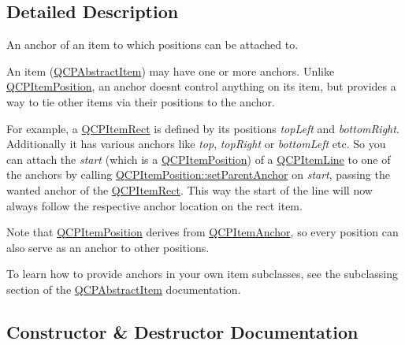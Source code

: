 \subsection{Detailed Description}
An anchor of an item to which positions can be attached to. 

An item (\hyperlink{classQCPAbstractItem}{Q\+C\+P\+Abstract\+Item}) may have one or more anchors. Unlike \hyperlink{classQCPItemPosition}{Q\+C\+P\+Item\+Position}, an anchor doesn\textquotesingle{}t control anything on its item, but provides a way to tie other items via their positions to the anchor.

For example, a \hyperlink{classQCPItemRect}{Q\+C\+P\+Item\+Rect} is defined by its positions {\itshape top\+Left} and {\itshape bottom\+Right}. Additionally it has various anchors like {\itshape top}, {\itshape top\+Right} or {\itshape bottom\+Left} etc. So you can attach the {\itshape start} (which is a \hyperlink{classQCPItemPosition}{Q\+C\+P\+Item\+Position}) of a \hyperlink{classQCPItemLine}{Q\+C\+P\+Item\+Line} to one of the anchors by calling \hyperlink{classQCPItemPosition_ac094d67a95d2dceafa0d50b9db3a7e51}{Q\+C\+P\+Item\+Position\+::set\+Parent\+Anchor} on {\itshape start}, passing the wanted anchor of the \hyperlink{classQCPItemRect}{Q\+C\+P\+Item\+Rect}. This way the start of the line will now always follow the respective anchor location on the rect item.

Note that \hyperlink{classQCPItemPosition}{Q\+C\+P\+Item\+Position} derives from \hyperlink{classQCPItemAnchor}{Q\+C\+P\+Item\+Anchor}, so every position can also serve as an anchor to other positions.

To learn how to provide anchors in your own item subclasses, see the subclassing section of the \hyperlink{classQCPAbstractItem}{Q\+C\+P\+Abstract\+Item} documentation. 

\subsection{Constructor \& Destructor Documentation}
